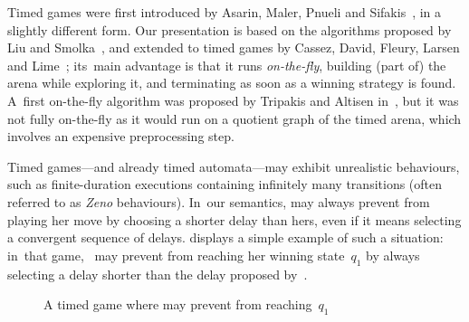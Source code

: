 Timed games were first introduced by Asarin, Maler, Pnueli and Sifakis~\cite{MPS95,AMPS98}, in a
slightly different form.  Our presentation is based on the algorithms
proposed by Liu and Smolka~\cite{LS98}, and extended to timed games by
Cassez, David, Fleury, Larsen and Lime~\cite{CDFLL05};
its~main advantage is that it runs \emph{on-the-fly}, building (part
of) the arena while exploring it, and terminating as soon as a winning
strategy is found.  A~first on-the-fly algorithm was proposed by Tripakis and Altisen
in~\cite{TA99}, but it was not fully on-the-fly as it would run on a
quotient graph of the timed arena, which involves an expensive
preprocessing step.

Timed games---and already timed automata---may exhibit unrealistic
behaviours, such as finite-duration executions containing infinitely
many transitions (often referred to as \emph{Zeno} behaviours).
In~our semantics, \Adam may always prevent \Eve from playing her move
by choosing a shorter delay than hers, even if it means selecting a convergent
sequence of delays.  displays a simple example of
such a situation: in~that game, \Adam~may prevent \Eve from reaching her
winning state~$q_1$ by always selecting a delay shorter than the delay
proposed by~\Eve.

\begin{figure}[ht]
  \centering
  \caption{A timed game where \Adam may prevent \Eve from reaching~$q_1$}
  \label{9-fig:exzeno}
\end{figure}

